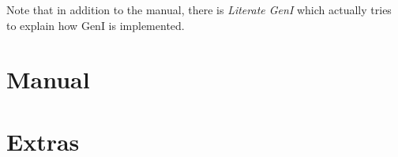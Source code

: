 \documentclass[a4paper,11pt]{report}
\begin{document}
Note that in addition to the manual, there is \textit{Literate GenI}
\cite{literateGeni} which actually tries to explain how GenI is
implemented.


\part{Manual}





\part{Extras}






{


}
\end{document}
